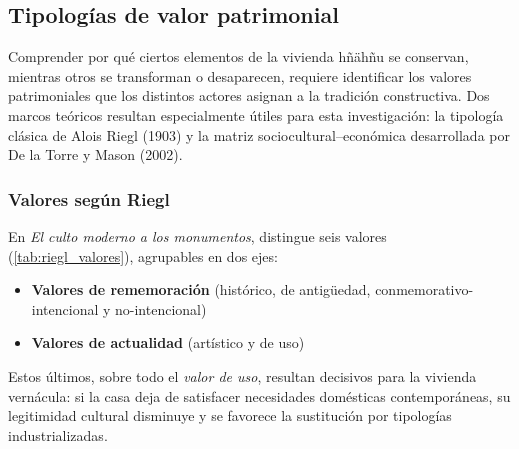 \subsection{Tipologías de valor patrimonial}
\label{subsec:tipologias_valor}

Comprender por qué ciertos elementos de la vivienda hñähñu se conservan,
mientras otros se transforman o desaparecen, requiere identificar los
valores patrimoniales que los distintos actores asignan a la
tradición constructiva.  Dos marcos teóricos resultan especialmente
útiles para esta investigación: la tipología clásica de Alois Riegl
(1903) y la matriz sociocultural–económica desarrollada por De la Torre
y Mason (2002).

\subsubsection{Valores según Riegl}

En \textit{El culto moderno a los monumentos}, \citeauthor{riegl1903} distingue seis valores
(\autoref{tab:riegl_valores}), agrupables en dos ejes:

\begin{itemize}
	\item \textbf{Valores de rememoración} (histórico, de antigüedad,
	      conmemorativo-intencional y no-intencional)
	\item \textbf{Valores de actualidad} (artístico y de uso)
\end{itemize}

Estos últimos, sobre todo el \emph{valor de uso}, resultan decisivos
para la vivienda vernácula: si la casa deja de satisfacer necesidades
domésticas contemporáneas, su legitimidad cultural disminuye y se
favorece la sustitución por tipologías industrializadas.

